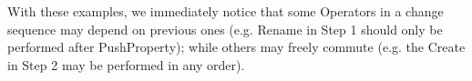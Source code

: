 With these examples, we immediately notice that some \textsf{Operator}s
in a change sequence may depend on previous ones (e.g. \textsf{Rename}
in Step 1 should only be performed after \textsf{PushProperty}); while others
may freely commute (e.g. the \textsf{Create} in Step 2 may be performed in any 
order).